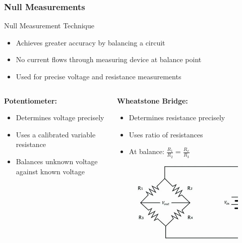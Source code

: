 \documentclass{beamer}
\begin{document}
\begin{frame}
    \frametitle{Null Measurements}
    \begin{block}{Null Measurement Technique}
        \begin{itemize}
            \item Achieves greater accuracy by balancing a circuit
            \item No current flows through measuring device at balance point
            \item Used for precise voltage and resistance measurements
        \end{itemize}
    \end{block}
    \begin{columns}
        \begin{column}{0.5\textwidth}
            \textbf{Potentiometer:}
            \begin{itemize}
                \item Determines voltage precisely
                \item Uses a calibrated variable resistance
                \item Balances unknown voltage against known voltage
            \end{itemize}
        \end{column}
        \begin{column}{0.5\textwidth}
            \textbf{Wheatstone Bridge:}
            \begin{itemize}
                \item Determines resistance precisely
                \item Uses ratio of resistances
                \item At balance: $\frac{R_1}{R_2} = \frac{R_x}{R_3}$
            \end{itemize}
   
    \begin{figure}
        \centering
        \includegraphics[width=0.5\linewidth]{wheatstone.jpg}
    \end{figure}
         \end{column}
    \end{columns}
\end{frame}
\end{document}

